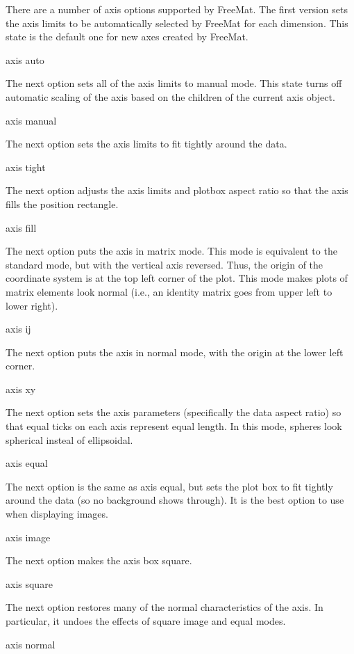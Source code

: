 There are a number of axis options supported by Free\-Mat. The first version sets the axis limits to be automatically selected by Free\-Mat for each dimension. This state is the default one for new axes created by Free\-Mat. \begin{DoxyVerb}  axis auto
\end{DoxyVerb}
 The next option sets all of the axis limits to {\ttfamily manual} mode. This state turns off automatic scaling of the axis based on the children of the current axis object. \begin{DoxyVerb}  axis manual
\end{DoxyVerb}
 The next option sets the axis limits to fit tightly around the data. \begin{DoxyVerb}  axis tight
\end{DoxyVerb}
 The next option adjusts the axis limits and plotbox aspect ratio so that the axis fills the position rectangle. \begin{DoxyVerb}  axis fill
\end{DoxyVerb}
 The next option puts the axis in matrix mode. This mode is equivalent to the standard mode, but with the vertical axis reversed. Thus, the origin of the coordinate system is at the top left corner of the plot. This mode makes plots of matrix elements look normal (i.\-e., an identity matrix goes from upper left to lower right). \begin{DoxyVerb}  axis ij
\end{DoxyVerb}
 The next option puts the axis in normal mode, with the origin at the lower left corner. \begin{DoxyVerb}  axis xy
\end{DoxyVerb}
 The next option sets the axis parameters (specifically the data aspect ratio) so that equal ticks on each axis represent equal length. In this mode, spheres look spherical insteal of ellipsoidal. \begin{DoxyVerb}  axis equal
\end{DoxyVerb}
 The next option is the same as {\ttfamily axis equal}, but sets the plot box to fit tightly around the data (so no background shows through). It is the best option to use when displaying images. \begin{DoxyVerb}  axis image
\end{DoxyVerb}
 The next option makes the axis box square. \begin{DoxyVerb}  axis square
\end{DoxyVerb}
 The next option restores many of the normal characteristics of the axis. In particular, it undoes the effects of {\ttfamily square} {\ttfamily image} and {\ttfamily equal} modes. \begin{DoxyVerb}  axis normal
\end{DoxyVerb}
